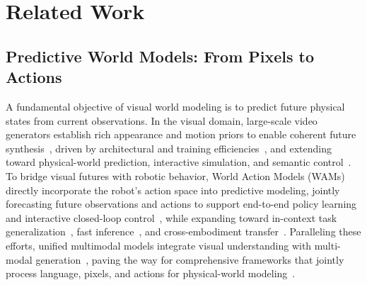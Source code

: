 \section{Related Work}
\label{sec:related}

\subsection{Predictive World Models: From Pixels to Actions}
A fundamental objective of visual world modeling is to predict future physical states from current observations. In the visual domain, large-scale video generators establish rich appearance and motion priors to enable coherent future synthesis~\citep{wan2025wan,seedance2026seedance2}, driven by architectural and training efficiencies~\citep{huang2025selfforcing,chen2025sanavideo}, and extending toward physical-world prediction, interactive simulation, and semantic control~\citep{nvidia2025cosmos,robbyant2026lingbotworld,chen2026h3world,bian2025videoasprompt}. To bridge visual futures with robotic behavior, World Action Models (WAMs) directly incorporate the robot's action space into predictive modeling, jointly forecasting future observations and actions to support end-to-end policy learning and interactive closed-loop control~\citep{ye2026dreamzero,li2026lingbotva}, while expanding toward in-context task generalization~\citep{zhou2026zerowam}, fast inference~\citep{yuan2026fastwam}, and cross-embodiment transfer~\citep{li2026egowam}. Paralleling these efforts, unified multimodal models integrate visual understanding with multi-modal generation~\citep{deng2025bagel}, paving the way for comprehensive frameworks that jointly process language, pixels, and actions for physical-world modeling~\citep{nvidia2026cosmos3}.

